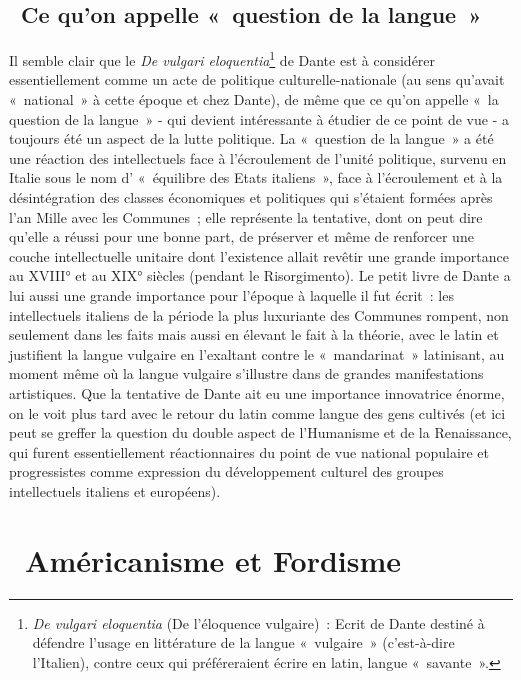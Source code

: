 \documentclass[french,twoside]{book} %
\newcommand\chapteropen{} %
\newcommand\chapterclose{} %
\begin{document}
\section[{ Ce qu’on appelle « question de la langue »}]{ Ce qu’on appelle « question de la langue »}
\noindent Il semble clair que le \emph{De vulgari eloquentia}\footnote{\emph{De vulgari eloquentia} (De l’éloquence vulgaire) : Ecrit de Dante destiné à défendre l’usage en littérature de la langue « vulgaire » (c’est-à-dire l’Italien), contre ceux qui préféreraient écrire en latin, langue « savante ». } de Dante est à considérer essentiellement comme un acte de politique culturelle-nationale (au sens qu’avait « national » à cette époque et chez Dante), de même que ce qu’on appelle « la question de la langue » - qui devient intéressante à étudier de ce point de vue - a toujours été un aspect de la lutte politique. La « question de la langue » a été une réaction des intellectuels face à l’écroulement de l’unité politique, survenu en Italie sous le nom d’ « équilibre des Etats italiens », face à l’écroulement et à la désintégration des classes économiques et politiques qui s’étaient formées après l’an Mille avec les Communes ; elle représente la tentative, dont on peut dire qu’elle a réussi pour une bonne part, de préserver et même de renforcer une couche intellectuelle unitaire dont l’existence allait revêtir une grande importance au XVIII° et au XIX° siècles (pendant le Risorgimento). Le petit livre de Dante a lui aussi une grande importance pour l’époque à laquelle il fut écrit : les intellectuels italiens de la période la plus luxuriante des Communes rompent, non seulement dans les faits mais aussi en élevant le fait à la théorie, avec le latin et justifient la langue vulgaire en l’exaltant contre le « mandarinat » latinisant, au moment même où la langue vulgaire s’illustre dans de grandes manifestations artistiques. Que la tentative de Dante ait eu une importance innovatrice énorme, on le voit plus tard avec le retour du latin comme langue des gens cultivés (et ici peut se greffer la question du double aspect de l’Humanisme et de la Renaissance, qui furent essentiellement réactionnaires du point de vue national populaire et progressistes comme expression du développement culturel des groupes intellectuels italiens et européens).
\chapterclose


\chapteropen
\chapter[{ Américanisme et Fordisme}]{ Américanisme et Fordisme}\renewcommand{\leftmark}{ Américanisme et Fordisme}
\end{document}
